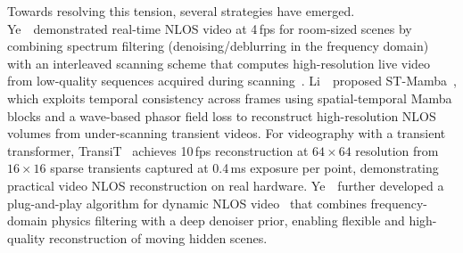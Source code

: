 Towards resolving this tension, several strategies have emerged. Ye~\etal~demonstrated real-time NLOS video at 4\,fps for room-sized scenes by combining spectrum filtering (denoising/deblurring in the frequency domain) with an interleaved scanning scheme that computes high-resolution live video from low-quality sequences acquired during scanning~\cite{yeRealTimeNLOS2024}. Li~\etal~proposed ST-Mamba~\cite{liMambaTemporalConsistency2024}, which exploits temporal consistency across frames using spatial-temporal Mamba blocks and a wave-based phasor field loss to reconstruct high-resolution NLOS volumes from under-scanning transient videos. For videography with a transient transformer, TransiT~\cite{liTransiT2025} achieves 10\,fps reconstruction at $64\times64$ resolution from $16\times16$ sparse transients captured at 0.4\,ms exposure per point, demonstrating practical video NLOS reconstruction on real hardware. Ye~\etal~further developed a plug-and-play algorithm for dynamic NLOS video~\cite{yePnPDynamic2024} that combines frequency-domain physics filtering with a deep denoiser prior, enabling flexible and high-quality reconstruction of moving hidden scenes.
